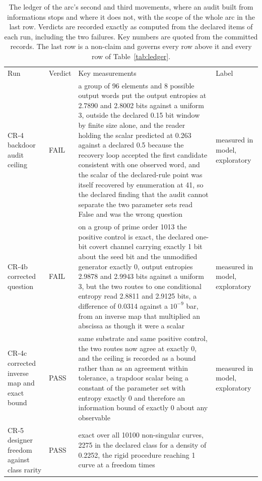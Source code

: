 \documentclass[aps,pre,reprint,nofootinbib]{revtex4-2}
\begin{document}
\begin{table}[t]
\caption{The ledger of the arc's second and third movements, where an
audit built from informations stops and where it does not, with the
scope of the whole arc in the last row.  Verdicts are recorded exactly
as computed from the declared items of each run, including the two
failures.  Key numbers are quoted from the committed records.  The
last row is a non-claim and governs every row above it and every row
of Table~\ref{tab:ledger}.}
\label{tab:ledger2}
\begin{ruledtabular}
\footnotesize
\begin{tabular}{L{2.6cm}lL{9.6cm}L{2.9cm}}
Run & Verdict & Key measurements & Label \\
\colrule
CR-4 backdoor audit ceiling & FAIL & a group of 96 elements and 8
possible output words put the output entropies at 2.7890 and 2.8002
bits against a uniform 3, outside the declared 0.15 bit window by
finite size alone, and the reader holding the scalar predicted at
0.263 against a declared 0.5 because the recovery loop accepted the
first candidate consistent with one observed word, and the scalar of
the declared-rule point was itself recovered by enumeration at 41, so
the declared finding that the audit cannot separate the two parameter
sets read False and was the wrong question & measured in model,
exploratory \\
CR-4b corrected question & FAIL & on a group of prime order 1013 the
positive control is exact, the declared one-bit covert channel
carrying exactly 1 bit about the seed bit and the unmodified generator
exactly 0, output entropies 2.9878 and 2.9943 bits against a uniform
3, but the two routes to one conditional entropy read 2.8811 and
2.9125 bits, a difference of 0.0314 against a $10^{-9}$ bar, from an
inverse map that multiplied an abscissa as though it were a
scalar & measured in model, exploratory \\
CR-4c corrected inverse map and exact bound & PASS & same substrate
and same positive control, the two routes now agree at exactly 0, and
the ceiling is recorded as a bound rather than as an agreement within
tolerance, a trapdoor scalar being a constant of the parameter set
with entropy exactly 0 and therefore an information bound of exactly 0
about any observable & measured in model, exploratory \\
CR-5 designer freedom against class rarity & PASS & exact over all
10100 non-singular curves, 2275 in the declared class for a density of
0.2252, the rigid procedure reaching 1 curve at a freedom times

\end{tabular}
\end{ruledtabular}
\end{table}
\end{document}
